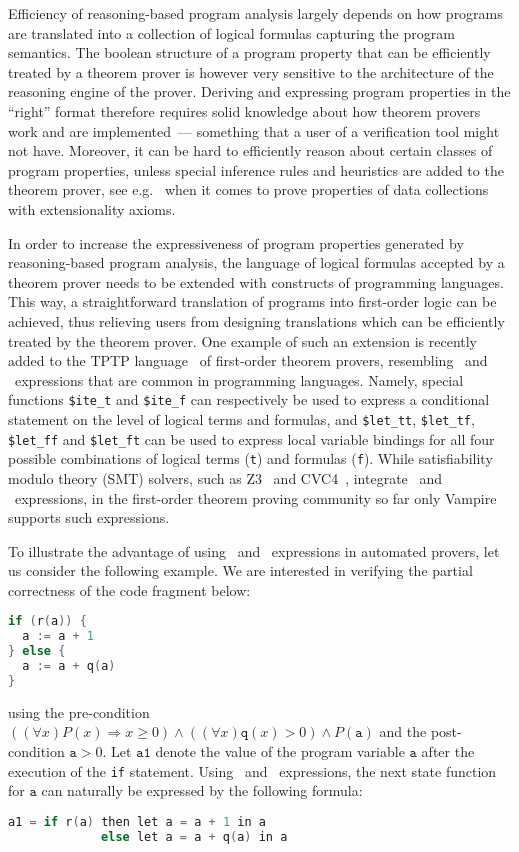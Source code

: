 Efficiency of reasoning-based program analysis largely depends on how programs are translated into a collection of logical formulas capturing the program semantics. The boolean structure of a program property that can be efficiently treated by a theorem prover is however very sensitive to the architecture of the reasoning engine of the prover. Deriving and expressing program properties in the ``right'' format therefore requires solid knowledge about how theorem provers work and are implemented~--- something that a user of a verification tool might not have. Moreover, it can be hard to efficiently reason about certain classes of program properties, unless special inference rules and heuristics are added to the theorem prover, see e.g.~\cite{ATVA14} when it comes to prove properties of data collections with extensionality axioms.

In order to increase the expressiveness of program properties generated by reasoning-based program analysis, the language of logical formulas accepted by a theorem prover needs to be extended with constructs of programming languages. This way, a straightforward translation of programs into first-order logic can be achieved, thus relieving users from designing translations which can be efficiently treated by the theorem prover.
One example of such an extension is recently added to the TPTP language~\cite{TPTP} of first-order theorem provers, resembling \ITE\ and \LETIN\ expressions that are common in programming languages. Namely, special functions \lstinline'$ite_t' and \lstinline'$ite_f' can respectively be used to express a conditional statement on the level of logical terms and formulas, and \lstinline'$let_tt', \lstinline'$let_tf', \lstinline'$let_ff' and \lstinline'$let_ft' can be used to express local variable bindings for all four possible combinations of logical terms (\lstinline't') and formulas (\lstinline'f'). While satisfiability modulo theory (SMT) solvers, such as Z3~\cite{Z3} and CVC4~\cite{CVC4}, integrate \ITE\ and \LETIN\ expressions, in the first-order theorem proving community so far only Vampire supports such expressions.

To illustrate the advantage of using \ITE\ and \LETIN\ expressions in automated provers, let us consider the following example. We are interested in verifying the partial correctness of the code fragment below:
\begin{lstlisting}[language=cpp]
if (r(a)) {
  a := a + 1
} else {
  a := a + q(a)
}
\end{lstlisting}
using the pre-condition $((\forall x) P(x) \Rightarrow x \ge 0) \wedge ((\forall x) \mathtt{q}(x) > 0) \wedge P(\mathtt{a})$ and the post-condition $\mathtt{a} > 0$.
Let $\mathtt{a1}$ denote the value of the program variable $\mathtt{a}$ after the execution of the \verb'if' statement. Using \ITE\ and \LETIN\ expressions, the next state function for $\mathtt{a}$ can naturally be expressed by the following formula:
\begin{lstlisting}[language=cpp]
a1 = if r(a) then let a = a + 1 in a
             else let a = a + q(a) in a
\end{lstlisting}

